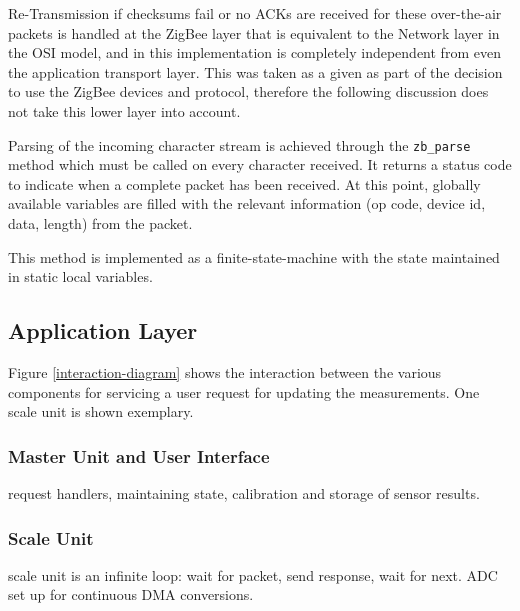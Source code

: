 Re-Transmission if checksums fail or no ACKs are received for these over-the-air packets is handled at the ZigBee layer that is equivalent to the Network layer in the OSI model, and in this implementation is completely independent from even the application transport layer. This was taken as a given as part of the decision to use the ZigBee devices and protocol, therefore the following discussion does not take this lower layer into account.


Parsing of the incoming character stream is achieved through the \texttt{zb\_parse} method which must be called on every character received. It returns a status code to indicate when a complete packet has been received. At this point, globally available variables are filled with the relevant information (op code, device id, data, length) from the packet.

This method is implemented as a finite-state-machine with the state maintained in static local variables. %

\subsection{Application Layer}
Figure \ref{interaction-diagram} shows the interaction between the various components for servicing a user request for updating the measurements. One scale unit is shown exemplary.

\subsubsection{Master Unit and User Interface}
request handlers, maintaining state, calibration and storage of sensor results.

\subsubsection{Scale Unit}
scale unit is an infinite loop: wait for packet, send response, wait for next. ADC set up for continuous DMA conversions.
